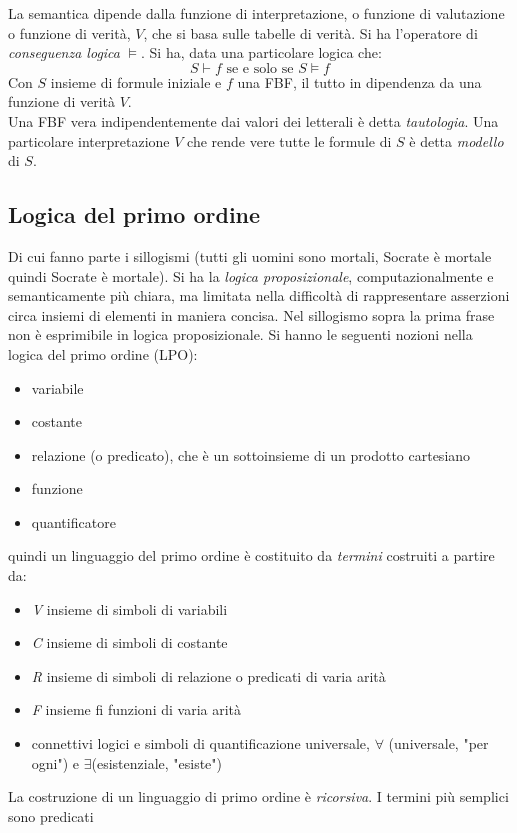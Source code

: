 \documentclass[a4paper,12pt, oneside]{book}
\begin{document}
La semantica dipende dalla funzione di interpretazione, o funzione di valutazione o funzione di verità, $V$, che si basa sulle tabelle di verità. Si ha l'operatore di \textit{conseguenza logica} $\models$. Si ha, data una particolare logica che:
$$S\vdash f \mbox{ se e solo se } S\models f$$
Con $S$ insieme di formule iniziale e $f$ una FBF, il tutto in dipendenza da una funzione di verità $V$.\\
Una FBF vera indipendentemente dai valori dei letterali è detta \textit{tautologia}. Una particolare interpretazione $V$ che rende vere tutte le formule di $S$ è detta \textit{modello} di $S$.
\newpage
\subsection{Logica del primo ordine}
Di cui fanno parte i sillogismi (tutti gli uomini sono mortali, Socrate è mortale quindi Socrate è mortale). Si ha la \textit{logica proposizionale}, computazionalmente e semanticamente più chiara, ma limitata nella difficoltà di rappresentare asserzioni circa insiemi di elementi in maniera concisa. Nel sillogismo sopra la prima frase non è esprimibile in logica proposizionale. Si hanno le seguenti nozioni nella logica del primo ordine (LPO):
\begin{itemize}
\item variabile
\item costante
\item relazione (o predicato), che è un sottoinsieme di un prodotto cartesiano
\item funzione
\item quantificatore
\end{itemize}
quindi un linguaggio del primo ordine è costituito da \textit{termini} costruiti a partire da:
\begin{itemize}
\item \textit{V} insieme di simboli di variabili
\item \textit{C} insieme di simboli di costante
\item \textit{R} insieme di simboli di relazione o predicati di varia arità
\item \textit{F} insieme fi funzioni di varia arità
\item connettivi logici e simboli di quantificazione universale, $\forall$ (universale, "per ogni") e $\exists$(esistenziale, "esiste")
\end{itemize}
La costruzione di un linguaggio di primo ordine è \textit{ricorsiva}. I termini più semplici sono predicati
\end{document}
